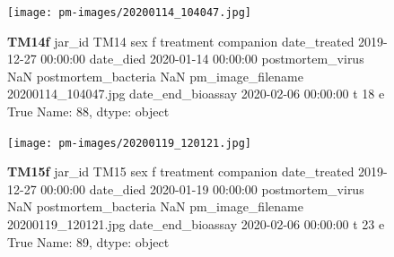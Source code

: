 \begin{figure}[h!]
\centering
\texttt{[image: pm-images/20200114\_104047.jpg]}
\caption{\textbf{TM14f} jar\_id                                TM14
sex                                      f
treatment                        companion
date\_treated           2019-12-27 00:00:00
date\_died              2020-01-14 00:00:00
postmortem\_virus                       NaN
postmortem\_bacteria                    NaN
pm\_image\_filename      20200114\_104047.jpg
date\_end\_bioassay      2020-02-06 00:00:00
t                                       18
e                                     True
Name: 88, dtype: object}
\end{figure}
\clearpage

\begin{figure}[h!]
\centering
\texttt{[image: pm-images/20200119\_120121.jpg]}
\caption{\textbf{TM15f} jar\_id                                TM15
sex                                      f
treatment                        companion
date\_treated           2019-12-27 00:00:00
date\_died              2020-01-19 00:00:00
postmortem\_virus                       NaN
postmortem\_bacteria                    NaN
pm\_image\_filename      20200119\_120121.jpg
date\_end\_bioassay      2020-02-06 00:00:00
t                                       23
e                                     True
Name: 89, dtype: object}
\end{figure}
\clearpage

